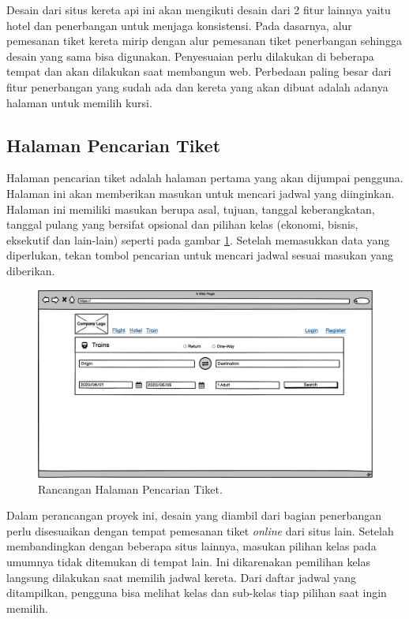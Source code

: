 Desain dari situs kereta api ini akan mengikuti desain dari 2 fitur lainnya yaitu hotel dan penerbangan untuk menjaga konsistensi. Pada dasarnya, alur pemesanan tiket kereta mirip dengan alur pemesanan tiket penerbangan sehingga desain yang sama bisa digunakan. Penyesuaian perlu dilakukan di beberapa tempat dan akan dilakukan saat membangun web. Perbedaan paling besar dari fitur penerbangan yang sudah ada dan kereta yang akan dibuat adalah adanya halaman untuk memilih kursi.

\subsection{Halaman Pencarian Tiket}
\label{subsec:rancanganpencariantiket}

Halaman pencarian tiket adalah halaman pertama yang akan dijumpai pengguna. Halaman ini akan memberikan masukan untuk mencari jadwal yang diinginkan. Halaman ini memiliki masukan berupa asal, tujuan, tanggal keberangkatan, tanggal pulang yang bersifat opsional dan pilihan kelas (ekonomi, bisnis, eksekutif dan lain-lain) seperti pada gambar \ref{img:rancangancaritiket}. Setelah memasukkan data yang diperlukan, tekan tombol pencarian untuk mencari jadwal sesuai masukan yang diberikan.

\begin{figure}[H]
\center
\includegraphics[width=\textwidth,height=\textheight,keepaspectratio]{Gambar/Halaman Pencarian Tiket.png}
\caption{Rancangan Halaman Pencarian Tiket.}
    \label{img:rancangancaritiket}
\end{figure}

Dalam perancangan proyek ini, desain yang diambil dari bagian penerbangan perlu disesuaikan dengan tempat pemesanan tiket \textit{online} dari situs lain. Setelah membandingkan dengan beberapa situs lainnya, masukan pilihan kelas pada umumnya tidak ditemukan di tempat lain. Ini dikarenakan pemilihan kelas langsung dilakukan saat memilih jadwal kereta. Dari daftar jadwal yang ditampilkan, pengguna bisa melihat kelas dan sub-kelas tiap pilihan saat ingin memilih.

